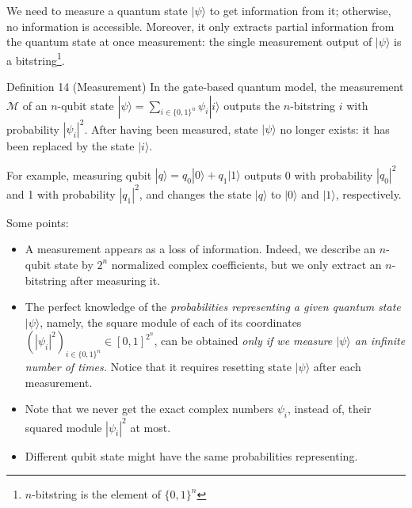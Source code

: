 We need to measure a quantum state $|\psi\rangle$ to get information from it; otherwise, no information is accessible.
Moreover, it only extracts partial information from the quantum state at once measurement: the single measurement output of  $|\psi\rangle$ is a bitstring\footnote{$n$-bitstring is the element of $\{0,1\}^{n}$}.

\begin{definition}
    Definition 14 (Measurement) In the gate-based quantum model, the measurement $\mathcal{M}$ of an $n$-qubit state $|\psi\rangle=\sum_{i \in\{0,1\}^{n}} \psi_{i}|i\rangle$ outputs the $n$-bitstring $i$ with probability $\left|\psi_{i}\right|^{2}$. After having been measured, state $|\psi\rangle$ no longer exists: it has been replaced by the state $|i\rangle$.
\end{definition}

\begin{example}
    For example, measuring qubit $|q\rangle=q_{0}|0\rangle+q_{1}|1\rangle$ outputs 0 with probability $\left|q_{0}\right|^{2}$ and 1 with probability $\left|q_{1}\right|^{2}$, and changes the state $|q\rangle$ to $|0\rangle$ and $|1\rangle$, respectively.  %
\end{example}

Some points:
\begin{itemize}
    \item A measurement appears as a loss of information. Indeed, we describe an $n$-qubit state by $2^{n}$ normalized complex coefficients, but we only extract an $n$-bitstring after measuring it. 
    \item The perfect knowledge of the \textit{probabilities representing a given quantum state $|\psi\rangle$}, namely, the square module of each of its coordinates $\left(\left|\psi_{i}\right|^{2}\right)_{i \in\{0,1\}^{n}} \in[0,1]^{2^{n}}$, can be obtained \textit{only if we measure $|\psi\rangle$ an infinite number of times.} Notice that it requires resetting state $|\psi\rangle$ after each measurement.
    \item Note that we never get the exact complex numbers $\psi_{i}$, instead of, their squared module $\left|\psi_{i}\right|^{2}$ at most.
    \item Different qubit state might have the same probabilities representing.
\end{itemize}


